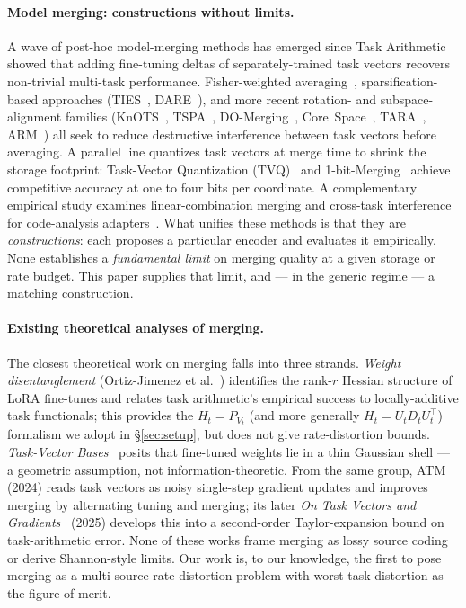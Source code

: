 \paragraph{Model merging: constructions without limits.}
A wave of post-hoc model-merging methods has emerged since Task
Arithmetic~\cite{ilharco2023task} showed that adding fine-tuning
deltas of separately-trained task vectors recovers non-trivial
multi-task performance. Fisher-weighted averaging~\cite{matena2022fisher},
sparsification-based approaches (TIES~\cite{yadav2023ties},
DARE~\cite{yu2024dare}), and more recent rotation- and
subspace-alignment families (KnOTS~\cite{stoica2025knots},
TSPA~\cite{tspa2025}, DO-Merging~\cite{domerging2025},
Core~Space~\cite{panariello2025core}, TARA~\cite{tara2025},
ARM~\cite{arm2026streaming}) all seek to reduce destructive
interference between task vectors before averaging. A parallel
line quantizes task vectors at merge time to shrink the storage
footprint: Task-Vector Quantization (TVQ)~\cite{kim2025tvq} and
1-bit-Merging~\cite{bit1merging2025} achieve competitive accuracy
at one to four bits per coordinate. A complementary empirical study
examines linear-combination merging and cross-task interference for
code-analysis adapters~\cite{concurrent2026merging}. What unifies these
methods is that they are \emph{constructions}: each proposes a particular
encoder and evaluates it empirically. None establishes a
\emph{fundamental limit} on merging quality at a given storage or
rate budget. This paper supplies that limit, and — in the generic
regime — a matching construction.

\paragraph{Existing theoretical analyses of merging.}
The closest theoretical work on merging falls into three strands.
\emph{Weight disentanglement} (Ortiz-Jimenez et
al.~\cite{ortizjimenez2023disentanglement}) identifies the
rank-$r$ Hessian structure of LoRA fine-tunes and relates task
arithmetic's empirical success to locally-additive task
functionals; this provides the $H_t = P_{V_t}$ (and more
generally $H_t = U_t D_t U_t^\top$) formalism we adopt in
\S\ref{sec:setup}, but does not give rate-distortion bounds.
\emph{Task-Vector Bases}~\cite{jang2025taskvectorbases} posits
that fine-tuned weights lie in a thin Gaussian shell — a
geometric assumption, not information-theoretic. From the same
group, ATM~\cite{atm2024alternating} (2024) reads task vectors as
noisy single-step gradient updates and improves merging by
alternating tuning and merging; its later \emph{On Task Vectors
and Gradients}~\cite{gradients2025taskvectorsgradients} (2025)
develops this into a second-order Taylor-expansion bound on
task-arithmetic error. None of these works frame
merging as lossy source coding or derive Shannon-style limits.
Our work is, to our knowledge, the first to pose merging as a
multi-source rate-distortion problem with worst-task distortion as the
figure of merit.

